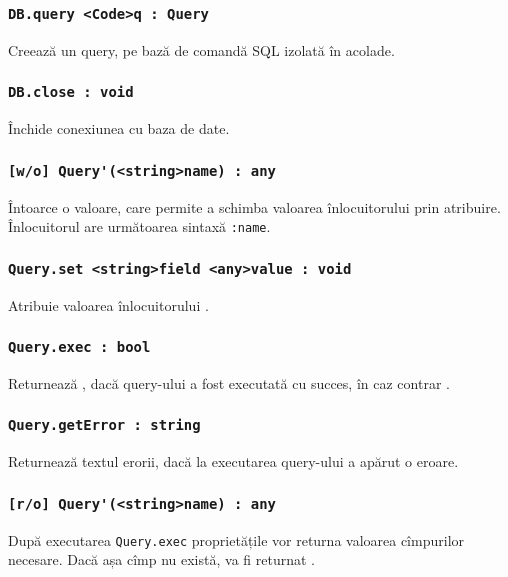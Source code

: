 \subsubsection{\lstinline|DB.query <Code>q : Query|}

Creează un query, pe bază de comandă SQL izolată în acolade.

\subsubsection{\lstinline|DB.close : void|}

Închide conexiunea cu baza de date.

\subsubsection{\lstinline|[w/o] Query'(<string>name) : any|}

Întoarce o valoare, care permite a schimba valoarea înlocuitorului prin atribuire. Înlocuitorul are următoarea sintaxă \lstinline|:name|.

\subsubsection{\lstinline|Query.set <string>field <any>value : void|}

Atribuie valoarea înlocuitorului .

\subsubsection{\lstinline|Query.exec : bool|}

Returnează \true, dacă query-ului a fost executată cu succes, în caz contrar \false.

\subsubsection{\lstinline|Query.getError : string|}

Returnează textul erorii, dacă la executarea query-ului a apărut o eroare.

\subsubsection{\lstinline|[r/o] Query'(<string>name) : any|}

După executarea \lstinline|Query.exec| proprietățile vor returna valoarea cîmpurilor necesare. Dacă așa cîmp nu există, va fi returnat \void.

